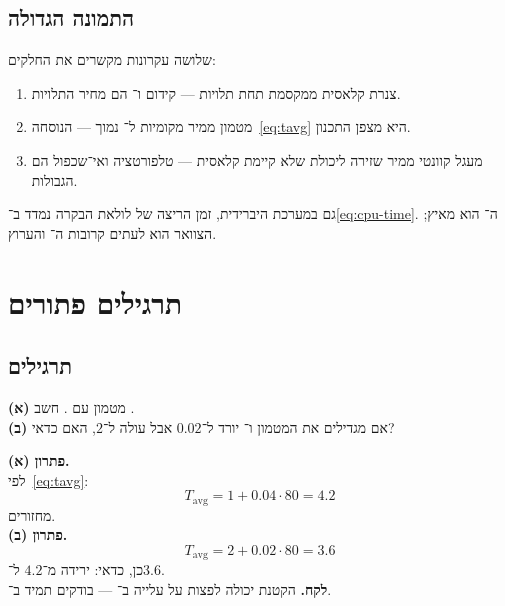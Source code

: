 \chapter{התמונה הגדולה}
\label{ch:bigpic}

שלושה עקרונות מקשרים את החלקים:
\begin{enumerate}
\item[(\textbf{א})] צנרת קלאסית ממקסמת  תחת תלויות —
  קידום ו־ הם מחיר התלויות.
\item[(\textbf{ב})] מטמון ממיר מקומיות ל־ נמוך —
  הנוסחה~\eqref{eq:tavg} היא מצפן התכנון.
\item[(\textbf{ג})] מעגל קוונטי ממיר שזירה ליכולת שלא קיימת קלאסית —
  טלפורטציה ואי־שכפול הם הגבולות.
\end{enumerate}

\begin{keybox}[frametitle={סיכום — נוסחת הזמן הקלאסית עדיין שולטת בבקרה}]
גם במערכת היברידית, זמן הריצה של לולאת הבקרה נמדד ב־\eqref{eq:cpu-time}.
ה־ הוא מאיץ; הצוואר הוא לעתים קרובות ה־ והערוץ.
\end{keybox}

\part{תרגילים פתורים}

\chapter{תרגילים}
\label{ch:exercises}

\begin{exbox}[frametitle={תרגיל 1 — חישוב \en{AMAT}}]
\textbf{(א)} מטמון עם .
חשב .\\[4pt]
\textbf{(ב)} אם מגדילים את המטמון ו־ יורד ל־$0.02$ אבל
 עולה ל־$2$, האם כדאי?
\end{exbox}

\begin{keybox}[frametitle={פתרון 1},nobreak=true]
\textbf{פתרון (א).}\\
לפי~\eqref{eq:tavg}:
\[ T_{\mathrm{avg}}=1+0.04\cdot 80=4.2 \]
מחזורים.\\[4pt]
\textbf{פתרון (ב).}\\
\[ T_{\mathrm{avg}}=2+0.02\cdot 80=3.6 \]
כן, כדאי: ירידה מ־$4.2$ ל־$3.6$.\\[4pt]
\textbf{לקח.} הקטנת  יכולה לפצות על עלייה ב־ —
בודקים תמיד ב־.
\end{keybox}

